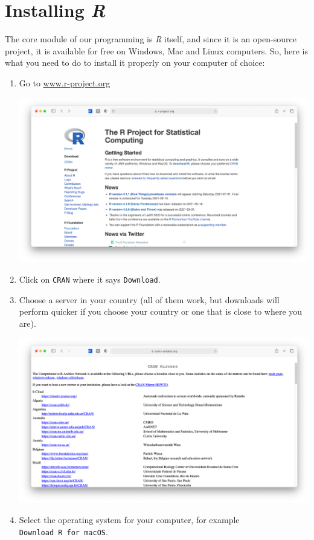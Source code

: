 \documentclass[
  letterpaper,
  DIV=11,
  numbers=noendperiod]{scrreprt}
\begin{document}
\section{\texorpdfstring{Installing
\emph{R}}{Installing R}}\label{sec-installing-r}

The core module of our programming is \emph{R} itself, and since it is
an open-source project, it is available for free on Windows, Mac and
Linux computers. So, here is what you need to do to install it properly
on your computer of choice:

\begin{enumerate}
\def\labelenumi{\arabic{enumi}.}
\item
  Go to \href{https://www.r-project.org}{www.r-project.org}

  \includegraphics{images/chapter_03_img/r_project/00_r_project_page.png}
\item
  Click on \texttt{CRAN} where it says \texttt{Download}.
\item
  Choose a server in your country (all of them work, but downloads will
  perform quicker if you choose your country or one that is close to
  where you are).

  \includegraphics{images/chapter_03_img/r_project/01_r_project_cran_mirror.png}
\item
  Select the operating system for your computer, for example
  \texttt{Download\ R\ for\ macOS}.


\end{enumerate}
\end{document}
